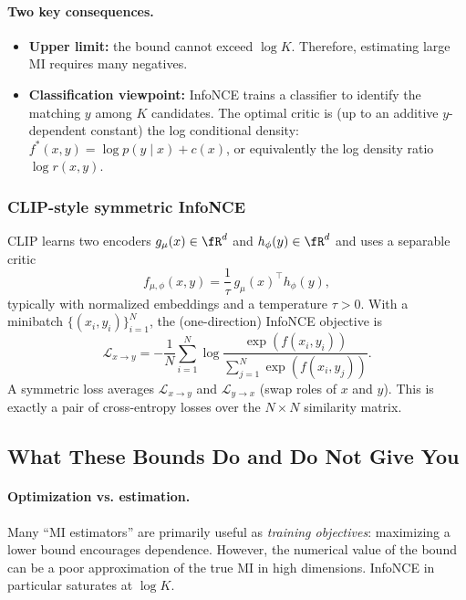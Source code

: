 \paragraph{Two key consequences.}
\begin{itemize}[leftmargin=2em]
    \item \textbf{Upper limit:} the bound cannot exceed $\log K$.
    Therefore, estimating large MI requires many negatives.

    \item \textbf{Classification viewpoint:}
    InfoNCE trains a classifier to identify the matching $y$ among $K$ candidates.
    The optimal critic is (up to an additive $y$-dependent constant) the log conditional density:
    \(f^*(x,y)=\log p(y\mid x)+c(x)\), or equivalently the log density ratio $\log r(x,y)$.
\end{itemize}

\subsubsection*{CLIP-style symmetric InfoNCE}

CLIP learns two encoders $g_\mu(x)\in\fR^d$ and $h_\phi(y)\in\fR^d$ and uses a separable critic
\begin{equation}
    f_{\mu,\phi}(x,y)=\frac{1}{\tau}\, g_\mu(x)^\top h_\phi(y),
\end{equation}
typically with normalized embeddings and a temperature $\tau>0$.
With a minibatch $\{(x_i,y_i)\}_{i=1}^N$, the (one-direction) InfoNCE objective is
\begin{equation}
\label{eq:clip-loss}
    \mathcal{L}_{x\to y}
    = -\frac{1}{N}\sum_{i=1}^N \log \frac{\exp(f(x_i,y_i))}{\sum_{j=1}^N \exp(f(x_i,y_j))}.
\end{equation}
A symmetric loss averages $\mathcal{L}_{x\to y}$ and $\mathcal{L}_{y\to x}$ (swap roles of $x$ and $y$).
This is exactly a pair of cross-entropy losses over the $N\times N$ similarity matrix.

\subsection{What These Bounds Do and Do Not Give You}
\label{sec:mi-est-practice}

\paragraph{Optimization vs. estimation.}
Many ``MI estimators'' are primarily useful as \emph{training objectives}:
maximizing a lower bound encourages dependence.
However, the numerical value of the bound can be a poor approximation of the true MI in high dimensions.
InfoNCE in particular saturates at $\log K$.

